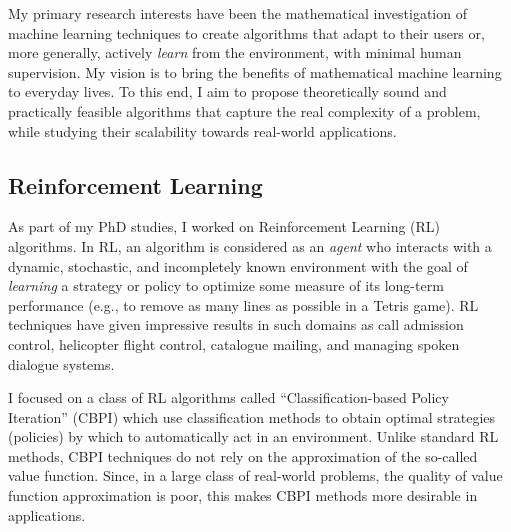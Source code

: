 My primary research interests have been the mathematical investigation of machine learning techniques to create algorithms that adapt to their users or, more generally, actively {\em learn} from the environment, with minimal human supervision. 
My vision is to bring the benefits of mathematical machine learning to everyday lives. To this end, 
I aim to propose theoretically sound and practically feasible algorithms that capture the real complexity of a problem, 
while studying their scalability towards real-world applications. 


\subsection{Reinforcement Learning} As part of my PhD studies, I worked on Reinforcement Learning (RL) algorithms. In RL, an algorithm is considered as an {\em agent} who interacts with a dynamic, stochastic, and
incompletely known environment with the goal of {\em learning} a strategy or policy to optimize some measure of its long-term performance (e.g., to remove as many lines as possible in a Tetris game). RL techniques have given impressive results in such domains as call admission control, helicopter flight control, catalogue mailing, and managing spoken dialogue systems.
 
I focused on a class of RL algorithms called ``Classification-based Policy Iteration'' (CBPI) which use classification methods to obtain optimal strategies (policies) by which to automatically act in an environment. Unlike standard RL methods, CBPI techniques do not rely on the approximation of the so-called value function. Since, in a large class of real-world problems, the quality of value function approximation is poor, this makes CBPI methods more desirable in applications.


